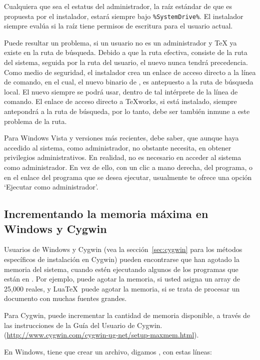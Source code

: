 \documentclass{article}
\begin{document}
Cualquiera que sea el estatus del administrador, la raíz estándar de
\TL{} que es propuesta por el instalador, estará siempre bajo
\verb|%SystemDrive%|. El instalador siempre evalúa si la raíz tiene
permisos de escritura para el usuario actual.

Puede resultar un problema, si un usuario no es un administrador y \TeX{}
ya existe en la ruta de búsqueda. Debido a que la ruta efectiva, consiste
de la ruta del sistema, seguida por la ruta del usuario, el nuevo \TL{}
nunca tendrá precedencia. Como medio de seguridad, el instalador crea un
enlace de acceso directo a la línea de comando, en el cual, el nuevo
binario de \TL{}, es antepuesto a la ruta de búsqueda local. El nuevo
\TL{} siempre se podrá usar, dentro de tal intérprete de la línea de
comando. El enlace de acceso directo a \TeX{}works, si está instalado,
siempre antepondrá \TL{} a la ruta de búsqueda, por lo tanto, debe ser
también inmune a este problema de la ruta. 

Para Windows Vista y versiones más recientes, debe saber, que aunque haya
accedido al sistema, como administrador, no obstante necesita, en obtener
privilegios administrativos. En realidad, no es necesario en acceder al
sistema como administrador. En vez de ello, con un clic a mano derecha,
del programa, o en el enlace del programa que se desea ejecutar,
usualmente te ofrece una opción `Ejecutar como administrador'.

\subsection{Incrementando la memoria máxima en Windows y Cygwin}
\label{sec:cygwin-maxmem}

Usuarios de Windows y Cygwin (vea la sección~\ref{sec:cygwin}
para los métodos específicos de instalación en Cygwin) pueden
encontrarse que han agotado la memoria del sistema, cuando
estén ejecutando algunos de los programas que están en \TL{}.
Por ejemplo,  puede agotar la memoria, si usted
asigna un array de 25,000 reales, y Lua\TeX\ puede agotar la
memoria, si se trata de procesar un documento con muchas
fuentes grandes. 

Para Cygwin, puede incrementar la cantidad de memoria disponible, a través
de las instrucciones de la Guía del Usuario de Cygwin.  
(\url{http://www.cygwin.com/cygwin-ug-net/setup-maxmem.html}).

En Windows, tiene que crear un archivo, digamos , con
estas líneas:
\end{document}

